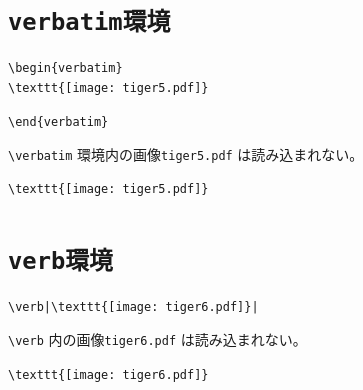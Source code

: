 \documentclass{jsarticle}
\begin{document}
\section{\tt{verbatim}環境}

\begin{verbatim}
\begin{verbatim}
\texttt{[image: tiger5.pdf]}
\end{verbatim}
\verb|\end{verbatim}|

\verb|\verbatim| 環境内の画像\texttt{tiger5.pdf} は読み込まれない。

\begin{verbatim}
\texttt{[image: tiger5.pdf]}

\end{verbatim}

\section{\tt{verb}環境}
\begin{verbatim}
\verb|\texttt{[image: tiger6.pdf]}|
\end{verbatim}

\verb|\verb| 内の画像\texttt{tiger6.pdf} は読み込まれない。

\verb|\texttt{[image: tiger6.pdf]}|
\end{document}
